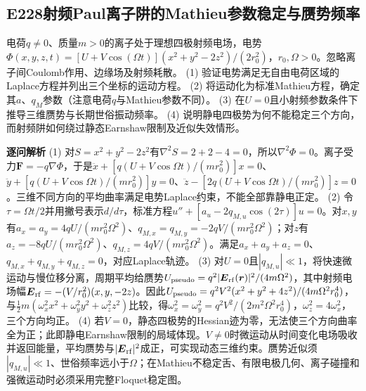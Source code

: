 \subsection*{E228\quad 射频Paul离子阱的Mathieu参数稳定与赝势频率}
电荷$q\ne0$、质量$m>0$的离子处于理想四极射频电场，电势$\Phi(x,y,z,t)=[U+V\cos(\Omega t)](x^2+y^2-2z^2)/(2r_0^2)$，$r_0,\Omega>0$。忽略离子间Coulomb作用、边缘场及射频耗散。
(1) 验证电势满足无自由电荷区域的Laplace方程并列出三个坐标的运动方程。
(2) 将运动化为标准Mathieu方程，确定其$a$、$q_M$参数（注意电荷$q$与Mathieu参数不同）。
(3) 在$U=0$且小射频参数条件下推导三维赝势与长期世俗振动频率。
(4) 说明静电四极势为何不能稳定三个方向，而射频阱如何绕过静态Earnshaw限制及近似失效情形。
\par\textbf{逐问解析}
(1) 对$S=x^2+y^2-2z^2$有$\nabla^2S=2+2-4=0$，所以$\nabla^2\Phi=0$。离子受力$\boldsymbol F=-q\nabla\Phi$，于是$\ddot x+[q(U+V\cos\Omega t)/(mr_0^2)]x=0$、$\ddot y+[q(U+V\cos\Omega t)/(mr_0^2)]y=0$、$\ddot z-[2q(U+V\cos\Omega t)/(mr_0^2)]z=0$。三维不同方向的平均曲率满足电势Laplace约束，不能全部靠静电正定。
(2) 令$\tau=\Omega t/2$并用撇号表示$d/d\tau$，标准方程$u''+[a_u-2q_{M,u}\cos(2\tau)]u=0$。对$x,y$有$a_x=a_y=4qU/(mr_0^2\Omega^2)$、$q_{M,x}=q_{M,y}=-2qV/(mr_0^2\Omega^2)$；对$z$有$a_z=-8qU/(mr_0^2\Omega^2)$、$q_{M,z}=4qV/(mr_0^2\Omega^2)$。满足$a_x+a_y+a_z=0$、$q_{M,x}+q_{M,y}+q_{M,z}=0$，对应Laplace轨迹。
(3) 对$U=0$且$|q_{M,u}|\ll1$，将快速微运动与慢位移分离，周期平均给赝势$U_{\rm pseudo}=q^2|\boldsymbol E_{\rm rf}(\boldsymbol r)|^2/(4m\Omega^2)$，其中射频电场幅$\boldsymbol E_{\rm rf}=-(V/r_0^2)(x,y,-2z)$。因此$U_{\rm pseudo}=q^2V^2(x^2+y^2+4z^2)/(4m\Omega^2r_0^4)$，与$\tfrac12m(\omega_x^2x^2+\omega_y^2y^2+\omega_z^2z^2)$比较，得$\omega_x^2=\omega_y^2=q^2V^2/(2m^2\Omega^2r_0^4)$，$\omega_z^2=4\omega_x^2$，三个方向均正。
(4) 若$V=0$，静态四极势的Hessian迹为零，无法使三个方向曲率全为正；此即静电Earnshaw限制的局域体现。$V\ne0$时微运动从时间变化电场吸收并返回能量，平均赝势与$|\boldsymbol E_{\rm rf}|^2$成正，可实现动态三维约束。赝势近似须$|q_{M,u}|\ll1$、世俗频率远小于$\Omega$；在Mathieu不稳定舌、有限电极几何、离子碰撞和强微运动时必须采用完整Floquet稳定图。
\par\medskip
